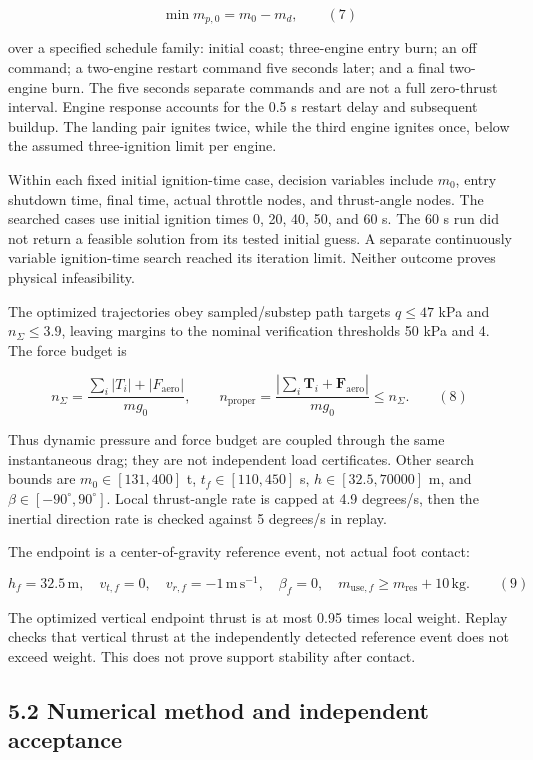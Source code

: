 \documentclass[
  11pt,
  a4paper,
]{article}
\begin{document}
\[ \min m_{p,0}=m_0-m_d, \qquad (7) \]

over a specified schedule family: initial coast; three-engine entry
burn; an off command; a two-engine restart command five seconds later;
and a final two-engine burn. The five seconds separate commands and are
not a full zero-thrust interval. Engine response accounts for the 0.5 s
restart delay and subsequent buildup. The landing pair ignites twice,
while the third engine ignites once, below the assumed three-ignition
limit per engine.

Within each fixed initial ignition-time case, decision variables include
\(m_0\), entry shutdown time, final time, actual throttle nodes, and
thrust-angle nodes. The searched cases use initial ignition times 0, 20,
40, 50, and 60 s. The 60 s run did not return a feasible solution from
its tested initial guess. A separate continuously variable ignition-time
search reached its iteration limit. Neither outcome proves physical
infeasibility.

The optimized trajectories obey sampled/substep path targets \(q\le47\)
kPa and \(n_\Sigma\le3.9\), leaving margins to the nominal verification
thresholds 50 kPa and 4. The force budget is

\[ n_\Sigma=\frac{\sum_i|T_i|+|F_{\mathrm{aero}}|}{mg_0},\qquad n_{\mathrm{proper}}=\frac{|\sum_i\mathbf T_i+\mathbf F_{\mathrm{aero}}|}{mg_0}\le n_\Sigma. \qquad (8) \]

Thus dynamic pressure and force budget are coupled through the same
instantaneous drag; they are not independent load certificates. Other
search bounds are \(m_0\in[131,400]\) t, \(t_f\in[110,450]\) s,
\(h\in[32.5,70000]\) m, and \(\beta\in[-90^\circ,90^\circ]\). Local
thrust-angle rate is capped at 4.9 degrees/s, then the inertial
direction rate is checked against 5 degrees/s in replay.

The endpoint is a center-of-gravity reference event, not actual foot
contact:

\[ h_f=32.5\,\mathrm m,\quad v_{t,f}=0,\quad v_{r,f}=-1\,\mathrm{m\,s^{-1}},\quad\beta_f=0,\quad m_{{\mathrm{use}},f}\ge m_{\mathrm{res}}+10\,\mathrm{kg}. \qquad (9) \]

The optimized vertical endpoint thrust is at most 0.95 times local
weight. Replay checks that vertical thrust at the independently detected
reference event does not exceed weight. This does not prove support
stability after contact.

\subsection{5.2 Numerical method and independent
acceptance}\label{numerical-method-and-independent-acceptance}
\end{document}
